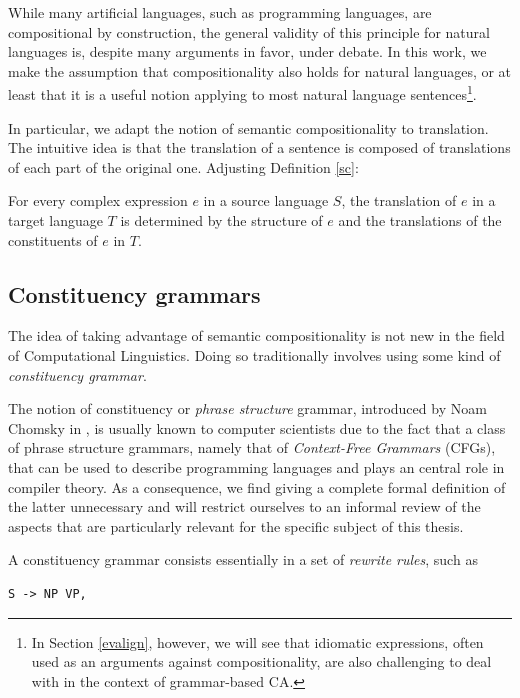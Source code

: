 While many artificial languages, such as programming languages, are compositional by construction, the general validity of this principle for natural languages is, despite many arguments in favor, under debate. 
In this work, we make the assumption that compositionality also holds for natural languages, or at least that it is a useful notion applying to most natural language sentences\footnote{In Section \ref{evalign}, however, we will see that idiomatic expressions, often used as an arguments against compositionality, are also challenging to deal with in the context of grammar-based CA.}. \smallskip

In particular, we adapt the notion of semantic compositionality to translation. 
The intuitive idea is that the translation of a sentence is composed of translations of each part of the original one. Adjusting Definition \ref{sc}:

\begin{definition}
    For every complex expression $e$ in a source language $S$, the translation of $e$ in a target language $T$ is determined by the structure of $e$ and the translations of the constituents of $e$ in $T$.
\end{definition}

\subsection{Constituency grammars}
The idea of taking advantage of semantic compositionality is not new in the field of Computational Linguistics. 
Doing so traditionally involves using some kind of \textit{constituency grammar}. \smallskip

The notion of constituency or \textit{phrase structure} grammar, introduced by Noam Chomsky in \cite{chomsky}, is usually known to computer scientists due to the fact that a class of phrase structure grammars, namely that of \textit{Context-Free Grammars} (CFGs), that can be used to describe programming languages and plays an central role in compiler theory. 
As a consequence, we find giving a complete formal definition of the latter unnecessary and will restrict ourselves to an informal review of the aspects that are particularly relevant for the specific subject of this thesis. \smallskip

A constituency grammar consists essentially in a set of \textit{rewrite rules}, such as 

\begin{lstlisting}[frame=none]
    S -> NP VP,
\end{lstlisting}

